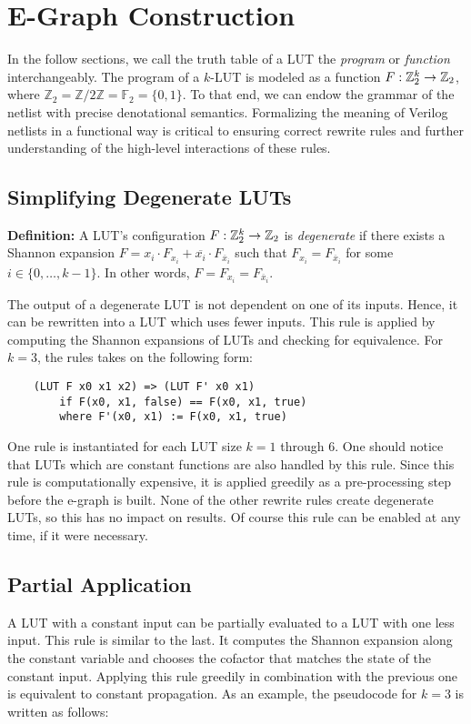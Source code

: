 \section{E-Graph Construction}\label{sec:rewrites}

In the follow sections, we call the truth table of a LUT the \textit{program}
or \textit{function} interchangeably. The program of a $k$-LUT is modeled as a
function $F : \mathbb{Z}_{2}^{k} \rightarrow \mathbb{Z}_{2}$, where $\mathbb{Z}_2 = \mathbb{Z}/2\mathbb{Z}
    = \mathbb{F}_2 = \{0,1\}$. To that end, we can endow the grammar of the netlist
with precise denotational semantics. Formalizing the meaning of Verilog
netlists in a functional way is critical to ensuring correct rewrite rules and
further understanding of the high-level interactions of these rules.

\subsection{Simplifying Degenerate LUTs}\label{sec:rewrites:degen}

\textbf{Definition:} A LUT's configuration $F : \mathbb{Z}_{2}^{k} \rightarrow \mathbb{Z}_{2}$ is \textit{degenerate} if there exists a Shannon expansion $F = x_i \cdot F_{x_i} + \overline{x_i} \cdot F_{\overline{x}_i}$
such that $F_{x_i} = F_{\overline{x}_i}$ for some $i \in \{ 0, \ldots, k -1\}$. In other words, $F = F_{x_i} = F_{\overline{x}_i}$.

The output of a degenerate LUT is not dependent on one of its inputs. Hence, it
can be rewritten into a LUT which uses fewer inputs. This rule is applied by
computing the Shannon expansions of LUTs and checking for equivalence. For
$k=3$, the rules takes on the following form:

\begin{verbatim}
    (LUT F x0 x1 x2) => (LUT F' x0 x1)
        if F(x0, x1, false) == F(x0, x1, true)
        where F'(x0, x1) := F(x0, x1, true)
\end{verbatim}

One rule is instantiated for each LUT size $k =1$ through 6. One should notice
that LUTs which are constant functions are also handled by this rule. Since
this rule is computationally expensive, it is applied greedily as a
pre-processing step before the e-graph is built. None of the other rewrite
rules create degenerate LUTs, so this has no impact on results. Of course this
rule can be enabled at any time, if it were necessary.

\subsection{Partial Application}\label{sec:rewrites:application}
A LUT with a constant input can be partially evaluated to a LUT with one less
input. This rule is similar to the last. It computes the Shannon expansion
along the constant variable and chooses the cofactor that matches the state of
the constant input. Applying this rule greedily in combination with the
previous one is equivalent to constant propagation. As an example, the
pseudocode for $k=3$ is written as follows:


